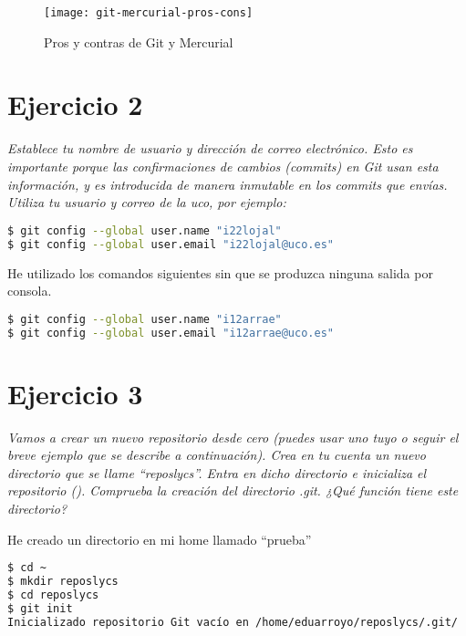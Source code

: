 \begin{figure}[H]
    \centering
    \texttt{[image: git-mercurial-pros-cons]}
    \caption{Pros y contras de Git y Mercurial\cite{intland_2015:Pros_Cons_Mercurial_Git}}
    \label{fig:git-mercurial-pros-cons}
\end{figure}


\section{Ejercicio 2}
\begin{center}
    \parbox{12cm}{\justify\textit{
        Establece tu nombre de usuario y dirección de correo electrónico. Esto es importante porque las confirmaciones de cambios (commits) en Git usan esta información, y es introducida de manera inmutable en los commits que envías. Utiliza tu usuario y correo de la uco, por ejemplo:}}
    \end{center}


\begin{lstlisting}[xleftmargin=.16\textwidth,language=bash]
$ git config --global user.name "i22lojal"
$ git config --global user.email "i22lojal@uco.es"
\end{lstlisting}

He utilizado los comandos siguientes sin que se produzca ninguna salida por consola.
\begin{lstlisting}[xleftmargin=.16\textwidth,language=bash]
$ git config --global user.name "i12arrae"
$ git config --global user.email "i12arrae@uco.es"
\end{lstlisting}


\section{Ejercicio 3}
\begin{center}
    \parbox{12cm}{\justify\textit{Vamos a crear un nuevo repositorio desde cero (puedes usar uno tuyo o seguir el breve ejemplo que se describe a continuación). Crea en tu cuenta un nuevo directorio que se llame “reposlycs”. Entra en dicho directorio e inicializa el repositorio (). Comprueba la creación del directorio .git. ¿Qué función tiene este directorio?
    }}
\end{center}
He creado un directorio en mi home llamado ``prueba''
\begin{lstlisting}[xleftmargin=.16\textwidth,language=bash]
$ cd ~
$ mkdir reposlycs
$ cd reposlycs
$ git init
Inicializado repositorio Git vacío en /home/eduarroyo/reposlycs/.git/
\end{lstlisting}

